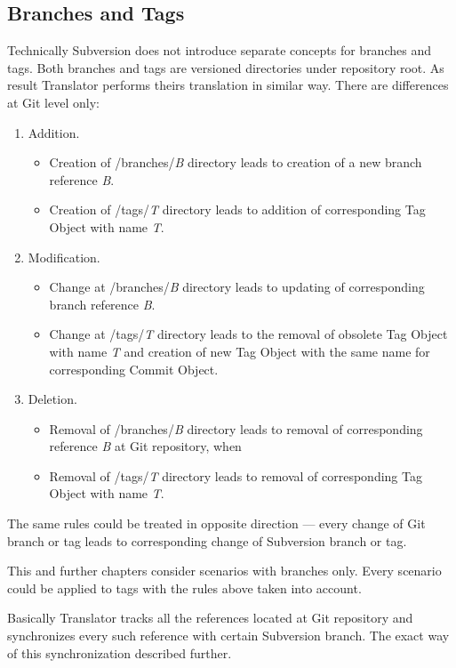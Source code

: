 \subsection{Branches and Tags}
\renewcommand{\figurename}{Diagram}

Technically Subversion does not introduce separate concepts for branches and tags. Both branches and tags are versioned directories under repository root. As result Translator performs theirs translation in similar way. There are differences at Git level only:
\begin{enumerate}
	\compactlist
	\item Addition.
	\begin{itemize}
		\item Creation of /branches/\emph{B} directory leads to creation of a new branch reference \emph{B}.
		\item Creation of /tags/\emph{T} directory leads to addition of corresponding Tag Object with name \emph{T}.
	\end{itemize}
	\item Modification.
	\begin{itemize}
		\item Change at /branches/\emph{B} directory leads to updating of corresponding branch reference \emph{B}.
		\item Change at /tags/\emph{T} directory leads to the removal of obsolete Tag Object with name \emph{T} and creation of new Tag Object with the same name for corresponding Commit Object.
	\end{itemize}
	\item Deletion.
	\begin{itemize}
		\item Removal of /branches/\emph{B} directory leads to removal of corresponding reference \emph{B} at Git repository, when
		\item Removal of /tags/\emph{T} directory leads to removal of corresponding Tag Object with name \emph{T}.
	\end{itemize}
\end{enumerate}

The same rules could be treated in opposite direction --- every change of Git branch or tag leads to corresponding change of Subversion branch or tag.

This and further chapters consider scenarios with branches only. Every scenario could be applied to tags with the rules above taken into account.

Basically Translator tracks all the references located at Git repository and synchronizes every such reference with certain Subversion branch. The exact way of this synchronization described further.

